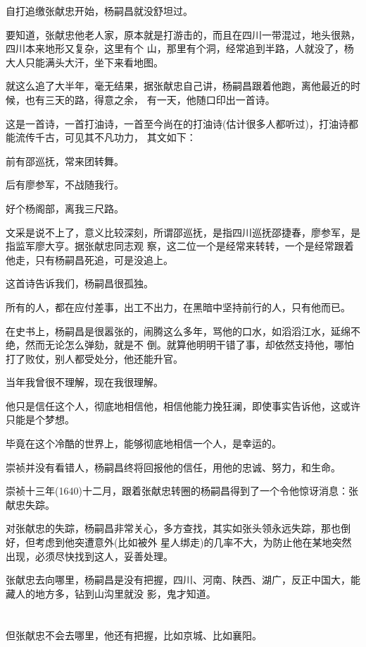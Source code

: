 \documentclass[11pt,a4paper,onecolumn]{article}
\begin{document}
自打追缴张献忠开始，杨嗣昌就没舒坦过。

要知道，张献忠他老人家，原本就是打游击的，而且在四川一带混过，地头很熟，四川本来地形又复杂，这里有个
山，那里有个洞，经常追到半路，人就没了，杨大人只能满头大汗，坐下来看地图。

就这么追了大半年，毫无结果，据张献忠自己讲，杨嗣昌跟着他跑，离他最近的时候，也有三天的路，得意之余，
有一天，他随口印出一首诗。

这是一首诗，一首打油诗，一首至今尚在的打油诗(估计很多人都听过)，打油诗都能流传千古，可见其不凡功力，
其文如下：

前有邵巡抚，常来团转舞。

后有廖参军，不战随我行。

好个杨阁部，离我三尺路。

文采是说不上了，意义比较深刻，所谓邵巡抚，是指四川巡抚邵捷春，廖参军，是指监军廖大亨。据张献忠同志观
察，这二位一个是经常来转转，一个是经常跟着他走，只有杨嗣昌死追，可是没追上。

这首诗告诉我们，杨嗣昌很孤独。

所有的人，都在应付差事，出工不出力，在黑暗中坚持前行的人，只有他而已。

在史书上，杨嗣昌是很嚣张的，闹腾这么多年，骂他的口水，如滔滔江水，延绵不绝，然而无论怎么弹劾，就是不
倒。就算他明明干错了事，却依然支持他，哪怕打了败仗，别人都受处分，他还能升官。

当年我曾很不理解，现在我很理解。

他只是信任这个人，彻底地相信他，相信他能力挽狂澜，即使事实告诉他，这或许只能是个梦想。

毕竟在这个冷酷的世界上，能够彻底地相信一个人，是幸运的。

崇祯并没有看错人，杨嗣昌终将回报他的信任，用他的忠诚、努力，和生命。

崇祯十三年(1640)十二月，跟着张献忠转圈的杨嗣昌得到了一个令他惊讶消息：张献忠失踪。

对张献忠的失踪，杨嗣昌非常关心，多方查找，其实如张头领永远失踪，那也倒好，但考虑到他突遭意外(比如被外
星人绑走)的几率不大，为防止他在某地突然出现，必须尽快找到这人，妥善处理。

张献忠去向哪里，杨嗣昌是没有把握，四川、河南、陕西、湖广，反正中国大，能藏人的地方多，钻到山沟里就没
影，鬼才知道。

\section[\thesection]{}

但张献忠不会去哪里，他还有把握，比如京城、比如襄阳。
\end{document}
